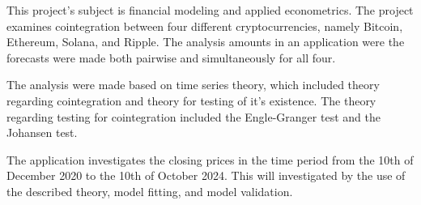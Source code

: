 \small
This project's subject is financial modeling and applied econometrics. The project examines cointegration between four different cryptocurrencies, namely Bitcoin, Ethereum, Solana, and Ripple. The analysis amounts in an application were the forecasts were made both pairwise and simultaneously for all four. 

The analysis were made based on time series theory, which included theory regarding cointegration and theory for testing of it's existence. The theory regarding testing for cointegration included the Engle-Granger test and the Johansen test. 

The application investigates the closing prices in the time period from the 10th of December 2020 to the 10th of October 2024. This will investigated by the use of the described theory, model fitting, and model validation. 









